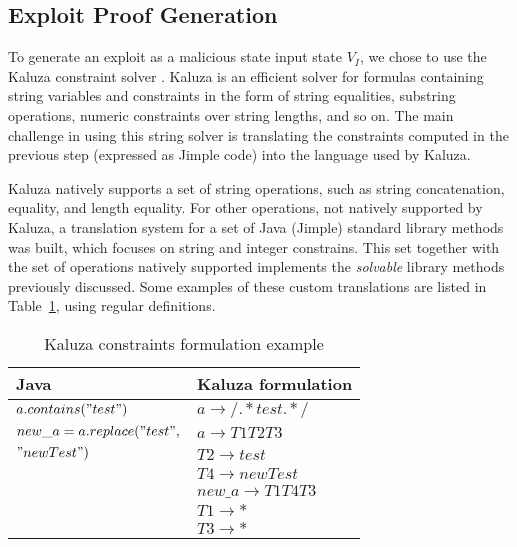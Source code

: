 
\subsection{Exploit Proof Generation}
 \label{section:kaluzaTranslation}

To generate an exploit as a malicious state input state $V_I$, we chose to use the Kaluza constraint solver \cite{kaluza}. Kaluza is an efficient solver for formulas containing string variables and constraints in the form of string equalities, substring operations, numeric constraints over string lengths, and so on. The main challenge in using this string solver is translating the constraints computed in the previous step (expressed as Jimple code) into the language used by Kaluza.

Kaluza natively supports a set of string operations, such as string concatenation, equality, and length equality. For other operations, not natively supported by Kaluza, a translation system for a set of Java (Jimple) standard library methods was built, which focuses on string and integer constrains. This set together with the set of operations natively supported implements the \emph{solvable} library methods previously discussed. Some examples of these custom translations are listed in Table~\ref{table:tabkaluza}, using regular definitions. 

\begin{table}[t]
\small
   \centering
    \begin{tabular}{|l|l|}
      \hline
      \textbf{Java} & \textbf{Kaluza formulation}\\
      \hline
      $a.contains("test")$ & $a \rightarrow /.*test.*/$ \\
      \hline
      $new\_a = a.replace("test",$ & $a \rightarrow T1 T2 T3$ \\
       $"newTest")$ & $T2 \rightarrow test$ \\
                      & $T4 \rightarrow newTest$ \\
                      & $new\_a \rightarrow T1 T4 T3 $ \\
                      & $T1 \rightarrow *$ \\
                      & $T3 \rightarrow *$ \\
      \hline
    \end{tabular}
    \caption{Kaluza constraints formulation example}
    \label{table:tabkaluza}
  \end{table}



